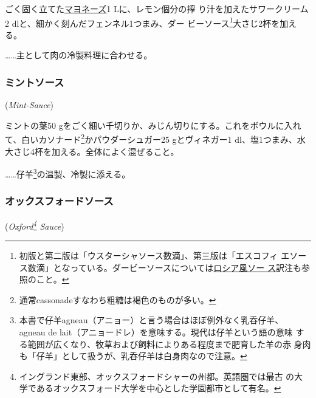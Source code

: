 \begin{recette}
ごく固く立てた\protect\hyperlink{mayonnaise}{マヨネーズ}1
Lに、レモン\undemi{}個分の搾 り汁を加えたサワークリーム2
dlと、細かく刻んだフェンネル1つまみ、ダー ビーソース\footnote{初版と第二版は「ウスターシャソース数滴」、第三版は「エスコフィ
  エソース数滴」となっている。ダービーソースについては\protect\hyperlink{sauce-russe-froide}{ロシア風ソー
  ス}訳注も参照のこと。}大さじ2杯を加える。

\ldots{}\ldots{}主として肉の冷製料理に合わせる。

\maeaki

\hypertarget{mint-sauce}{%
\subsubsection{ミントソース}\label{mint-sauce}}

\hspace{1em}(\emph{Mint-Sauce})


ミントの葉50
gをごく細い千切りか、みじん切りにする。これをボウルに入れて、白いカソナード\footnote{通常cassonadeすなわち粗糖は褐色のものが多い。}かパウダーシュガー25
gとヴィネガー1\undemi{}
dl、塩1つまみ、水大さじ4杯を加える。全体によく混ぜること。

\ldots{}\ldots{}仔羊\footnote{本書で仔羊agneau（アニョー）と言う場合はほぼ例外なく乳呑仔羊、
  agneau de lait（アニョードレ）を意味する。現代は仔羊という語の意味
  する範囲が広くなり、牧草および飼料によりある程度まで肥育した羊の赤
  身肉も「仔羊」として扱うが、乳呑仔羊は白身肉なので注意。}の温製、冷製に添える。

\maeaki

\hypertarget{oxford-sauce}{%
\subsubsection{オックスフォードソース}\label{oxford-sauce}}

\hspace{1em}(\emph{Oxford\footnote{イングランド東部、オックスフォードシャーの州都。英語圏では最古
  の大学であるオックスフォード大学を中心とした学園都市として有名。}
Sauce})


\end{recette}
